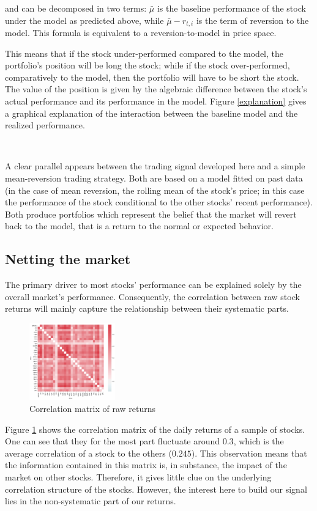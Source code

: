 \documentclass[letterpaper, 10 pt, conference]{ieeeconf}  %
\begin{document}
and can be decomposed in two terms: $\bar\mu$ is the baseline performance of the stock under the model as predicted above, while $\bar\mu - r_{t, i}$ is the term of reversion to the model. This formula is equivalent to a reversion-to-model in price space. 

This means that if the stock under-performed compared to the model, the portfolio's position will be long the stock; while if the stock over-performed, comparatively to the model, then the portfolio will have to be short the stock. The value of the position is given by the algebraic difference between the stock's actual performance and its performance in the model. Figure \ref{explanation} gives a graphical explanation of the interaction between the baseline model and the realized performance.

\

A clear parallel appears between the trading signal developed here and a simple mean-reversion trading strategy. Both are based on a model fitted on past data (in the case of mean reversion, the rolling mean of the stock's price; in this case the performance of the stock conditional to the other stocks' recent performance). Both produce portfolios which represent the belief that the market will revert back to the model, that is a return to the normal or expected behavior.

\subsection{Netting the market}
\label{net_market}

The primary driver to most stocks' performance can be explained solely by the overall market's performance. Consequently, the correlation between raw stock returns will mainly capture the relationship between their systematic parts. 

\begin{figure}[thpb]
\centering
\includegraphics[width=140px]{img/bad_correlation.png}
\caption{Correlation matrix of raw returns}
\label{badcorrelation}
\end{figure}
   

Figure \ref{badcorrelation} shows the correlation matrix of the daily returns of a sample of stocks. One can see that they for the most part fluctuate around $0.3$, which is the average correlation of a stock to the others ($0.245$). This observation means that the information contained in this matrix is, in substance, the impact of the market on other stocks. Therefore, it gives little clue on the underlying correlation structure of the stocks. However, the interest here to build our signal lies in the non-systematic part of our returns.  
\end{document}

